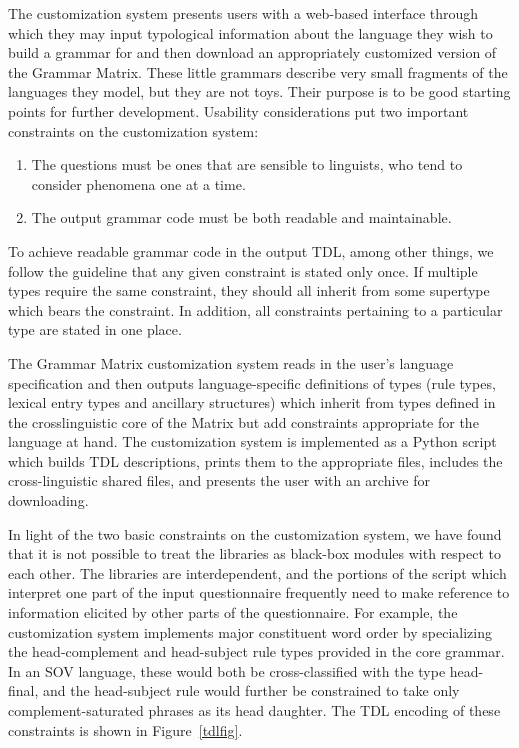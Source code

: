 \documentclass[11pt]{article}
\begin{document}
The customization system presents users with a
web-based interface through which they may input typological
information about the language they wish to build a grammar for and
then download an appropriately customized version of the Grammar
Matrix.  These little grammars describe very small fragments of the
languages they model, but they are not toys.  Their purpose is to be
good starting points for further development.  Usability
considerations put two important constraints on the customization
system: 

\begin{enumerate}
\item The questions must be ones that are sensible to linguists,
who tend to consider phenomena one at a time.  
\item The output grammar code must be both readable and maintainable.
\end{enumerate}
%
To achieve readable grammar code in the output TDL, among other
things, we follow the guideline that any given constraint is
stated only once.  If multiple types require the same constraint, they
should all inherit from some supertype which bears the constraint.
In addition, all constraints pertaining to a particular type are
stated in one place.

The Grammar Matrix customization system reads in the user's language
specification and then outputs language-specific definitions of types
(rule types, lexical entry types and ancillary structures) which
inherit from types defined in the crosslinguistic core of the Matrix
but add constraints appropriate for the language at hand. The customization
system is implemented as a Python script which builds TDL descriptions,
prints them to the appropriate files, includes the cross-linguistic
shared files, and presents the user with an archive for downloading.

In light of the two basic constraints on the customization system, we
have found that it is not possible to treat the libraries as black-box
modules with respect to each other.  The libraries are interdependent,
and the portions of the script which interpret one part of the input
questionnaire frequently need to make reference to information
elicited by other parts of the questionnaire.  For example, the
customization system implements major constituent word order by
specializing the head-complement and head-subject rule types provided
in the core grammar.  In an SOV language, these would both be
cross-classified with the type head-final, and the head-subject rule
would further be constrained to take only complement-saturated phrases
as its head daughter.  The TDL encoding of these constraints is shown
in Figure~\ref{tdlfig}.
\end{document}
